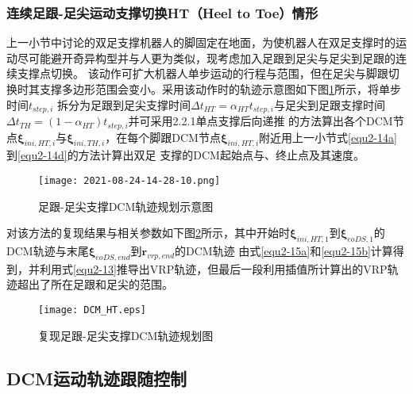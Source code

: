         \subsubsection{连续足跟-足尖运动支撑切换HT（Heel to Toe）情形}
            上一小节中讨论的双足支撑机器人的脚固定在地面，为使机器人在双足支撑时的运动尽可能避开奇异构型并与人更为类似，现考虑加入足跟到足尖与足尖到足跟的连续支撑点切换。
            该动作可扩大机器人单步运动的行程与范围，但在足尖与脚跟切换时其支撑多边形范围会变小。采用该动作时的轨迹示意图如下图\ref{fig2-7}所示，将单步时间$t_{step,i}$
            拆分为足跟到足尖支撑时间$\varDelta t_{HT}=\alpha_{HT}t_{step,i}$与足尖到足跟支撑时间$\varDelta t_{TH}=(1-\alpha_{HT})t_{step,i}$并可采用2.2.1单点支撑后向递推
            的方法算出各个DCM节点$\boldsymbol{\xi}_{ini,HT,i}$与$\boldsymbol{\xi}_{ini,TH,i}$，在每个脚跟DCM节点$\boldsymbol{\xi}_{ini,HT,i}$附近用上一小节式\eqref{equ2-14a}到\eqref{equ2-14d}的方法计算出双足
            支撑的DCM起始点与、终止点及其速度。
            \begin{figure}[h] 
                \centering
                \texttt{[image: 2021-08-24-14-28-10.png]}
                \caption{足跟-足尖支撑DCM轨迹规划示意图} \label{fig2-7}
            \end{figure}

            对该方法的复现结果与相关参数如下图\ref{fig2-8}所示，其中开始时$\boldsymbol{\xi}_{ini,HT,1}$到$\boldsymbol{\xi}_{eoDS,1}$的DCM轨迹与末尾$\boldsymbol{\xi}_{eoDS,end}$到$\boldsymbol{r}_{vrp,end}$的DCM轨迹
            由式\eqref{equ2-15a}和\eqref{equ2-15b}计算得到，并利用式\eqref{equ2-13}推导出VRP轨迹，但最后一段利用插值所计算出的VRP轨迹超出了所在足跟和足尖的范围。
            \begin{figure}[h] 
                \centering
                \texttt{[image: DCM\_HT.eps]}
                \caption{复现足跟-足尖支撑DCM轨迹规划图} \label{fig2-8}
            \end{figure}
    \subsection{DCM运动轨迹跟随控制}
    







